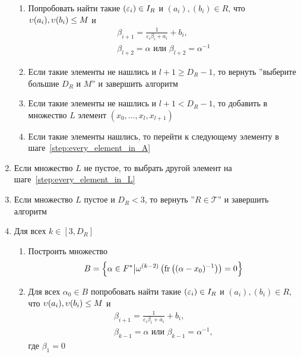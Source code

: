 \documentclass[_00_dissertation.tex]{subfiles}
\begin{document}
\begin{algorithm}
\begin{enumerate}
\begin{enumerate}
            \item Попробовать найти такие $(\varepsilon_i) \in I_{R}$ и $(a_i), (b_i) \in R$, что $\upsilon(a_i),\upsilon(b_i) \le M$ и
            \begin{equation*}
                \begin{split}
                    \beta_{i+1}=\frac{1}{\varepsilon_i \beta_i + a_i} + b_i,\\
                    \beta_{l+2}=\alpha \textrm{ или } \beta_{l+2}=\alpha^{-1}
                \end{split}
            \end{equation*}

            \item Если такие элементы не нашлись и $l+1 \ge D_R - 1$, то вернуть ''выберите большие $D_R$ и $M$'' и завершить алгоритм
            
            \item Если такие элементы не нашлись и $l+1 < D_R - 1$, то добавить в множество $L$ элемент $(x_0,\ldots,x_l,x_{l+1})$
            
            \item Если такие элементы нашлись, то перейти к следующему элементу в шаге~\ref{step:every_element_in_A}
        \end{enumerate}

        \item Если множество $L$ не пустое, то выбрать другой элемент на шаге~\ref{step:every_element_in_L}
        
        \item Если множество $L$ пустое и $D_R < 3$, то вернуть ''$R \in \mathcal{T}$'' и завершить алгоритм
        
        \item Для всех $k \in [3, D_R]$
        \begin{enumerate}
            \item Построить множество
            \begin{equation*}
                B = \left\{
                    \alpha \in F^{*} \big| \omega^{(k-2)}\left(
                        \textrm{fr}\left((\alpha-x_0)^{-1}\right)
                    \right) = 0
                \right\}
            \end{equation*}

            \item Для всех $\alpha_0 \in B$ попробовать найти такие $(\varepsilon_i) \in I_{R}$ и $(a_i), (b_i) \in R$, что $\upsilon(a_i), \upsilon(b_i) \le M$ и
            \begin{equation*}
                \begin{split}
                    \beta_{i + 1} = \frac{1}{\varepsilon_i \beta_i + a_i} + b_i,\\
                    \beta_{k - 1} = \alpha \textrm{ или } \beta_{k-1} = \alpha^{-1},
                \end{split}
            \end{equation*}
            где $\beta_1 = 0$


\end{enumerate}
\end{enumerate}
\end{algorithm}
\end{document}
